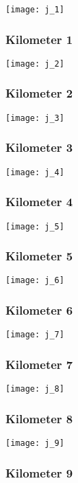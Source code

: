 \documentclass[]{article}
\begin{document}
\texttt{[image: j\_1]}

\subsubsection{Kilometer 1}\label{kilometer-1-9}

\texttt{[image: j\_2]}

\subsubsection{Kilometer 2}\label{kilometer-2-9}

\texttt{[image: j\_3]}

\subsubsection{Kilometer 3}\label{kilometer-3-9}

\texttt{[image: j\_4]}

\subsubsection{Kilometer 4}\label{kilometer-4-9}

\texttt{[image: j\_5]}

\subsubsection{Kilometer 5}\label{kilometer-5-9}

\texttt{[image: j\_6]}

\subsubsection{Kilometer 6}\label{kilometer-6-9}

\texttt{[image: j\_7]}

\subsubsection{Kilometer 7}\label{kilometer-7-8}

\texttt{[image: j\_8]}

\subsubsection{Kilometer 8}\label{kilometer-8-6}

\texttt{[image: j\_9]}

\subsubsection{Kilometer 9}\label{kilometer-9-5}
\end{document}
